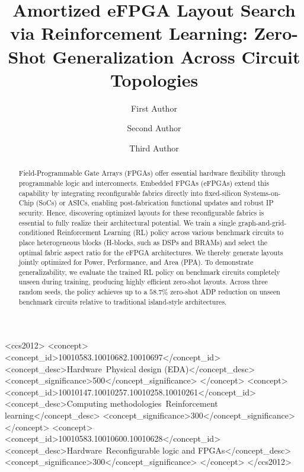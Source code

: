 \documentclass[sigconf]{acmart}
\title{Amortized eFPGA Layout Search via Reinforcement Learning: Zero-Shot Generalization Across Circuit Topologies}
\author{First Author}
\affiliation{%
  \institution{University Name}
  \city{City, State}
  \country{Country}
}
\author{Second Author}
\affiliation{%
  \institution{University Name}
  \city{City, State}
  \country{Country}
}
\author{Third Author}
\affiliation{%
  \institution{University Name}
  \city{City, State}
  \country{Country}
}
\begin{document}
\begin{abstract}
Field-Programmable Gate Arrays (FPGAs) offer essential hardware flexibility
through programmable logic and interconnects. Embedded FPGAs (eFPGAs) extend
this capability by integrating reconfigurable fabrics directly into
fixed-silicon Systems-on-Chip (SoCs) or ASICs, enabling post-fabrication
functional updates and robust IP security. Hence, discovering optimized
layouts for these reconfigurable fabrics is essential to fully realize their
architectural potential. We train a single
graph-and-grid-conditioned Reinforcement Learning (RL) policy across various
benchmark circuits to place heterogeneous blocks (H-blocks, such as DSPs and
BRAMs) and select the optimal fabric aspect ratio for the eFPGA
architectures. We thereby generate layouts jointly optimized for Power,
Performance, and Area (PPA). To demonstrate generalizability, we evaluate
the trained RL policy on benchmark circuits completely unseen during
training, producing highly efficient zero-shot layouts. Across three random
seeds, the policy achieves up to a $58.7\%$ zero-shot ADP reduction on
unseen benchmark circuits relative to traditional island-style
architectures.
\end{abstract}


\begin{CCSXML}
<ccs2012>
   <concept>
       <concept_id>10010583.10010682.10010697</concept_id>
       <concept_desc>Hardware~Physical design (EDA)</concept_desc>
       <concept_significance>500</concept_significance>
       </concept>
   <concept>
       <concept_id>10010147.10010257.10010258.10010261</concept_id>
       <concept_desc>Computing methodologies~Reinforcement learning</concept_desc>
       <concept_significance>300</concept_significance>
       </concept>
   <concept>
       <concept_id>10010583.10010600.10010628</concept_id>
       <concept_desc>Hardware~Reconfigurable logic and FPGAs</concept_desc>
       <concept_significance>300</concept_significance>
       </concept>
 </ccs2012>
\end{CCSXML}


\maketitle
\end{document}
